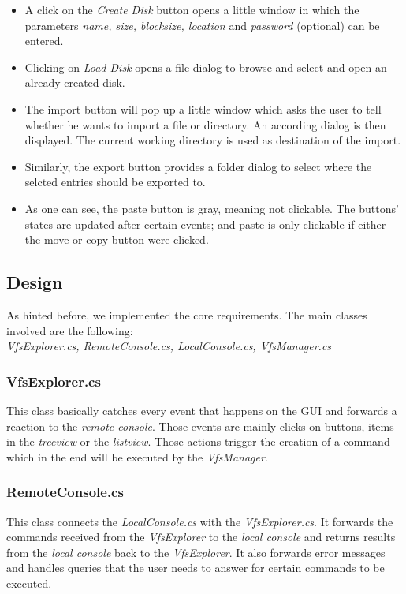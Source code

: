 \documentclass[a4paper,12pt]{article}
\begin{document}
\begin{itemize}
\item A click on the \emph{Create Disk} button opens a little window in which the parameters \emph{ name, size, blocksize, location} and \emph{password} (optional) can be entered.
\item Clicking on \emph{Load Disk} opens a file dialog to browse and select and open an already created disk.
\item The import button will pop up a little window which asks the user to tell whether he wants to import a file or directory. An according dialog is then displayed. The current working directory is used as destination of the import.
\item Similarly, the export button provides a folder dialog to select where the selcted entries should be exported to.
\item As one can see, the paste button is gray, meaning not clickable. The buttons' states are updated after certain events; and paste is only clickable if either the move or copy button were clicked.
\end{itemize}


\subsection{Design}

As hinted before, we implemented the core requirements. The main classes involved are the following: \\
\emph{VfsExplorer.cs, RemoteConsole.cs, LocalConsole.cs, VfsManager.cs}
\subsubsection{VfsExplorer.cs}
This class basically catches every event that happens on the GUI and forwards a reaction to the \emph{remote console}. Those events are mainly clicks on buttons, items in the \emph{treeview} or the \emph{listview}. Those actions trigger the creation of a command which in the end will be executed by the \emph{VfsManager}.
\subsubsection{RemoteConsole.cs}
This class connects the \emph{LocalConsole.cs} with the \emph{VfsExplorer.cs}. It forwards the commands received from the \emph{VfsExplorer} to the \emph{local console} and returns results from the \emph{local console} back to the \emph{VfsExplorer}. It also forwards error messages and handles queries that the user needs to answer for certain commands to be executed.
\end{document}
